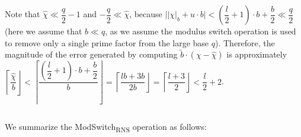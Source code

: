 Note that $\hat\chi \ll \dfrac{q}{2}-1$ and $-\dfrac{q}{2} \ll \hat\chi$, because $\Big||\chi|_b + u\cdot b\Big| < \left(\dfrac{l}{2} + 1\right)\cdot b + \dfrac{b}{2} \ll \dfrac{q}{2}$ (here we assume that $b \ll q$, as we assume the modulus switch operation is used to remove only a single prime factor from the large base $q$). Therefore, the magnitude of the error generated by computing $\tilde b \cdot (\chi - \hat\chi)$ is approximately $\left\lceil\dfrac{\hat\chi}{b}\right\rfloor <  \left\lceil\dfrac{\left(\dfrac{l}{2} + 1\right)\cdot b + \dfrac{b}{2}}{b}\right\rfloor = \left\lceil\dfrac{lb + 3b}{2b}\right\rfloor = \left\lceil\dfrac{l + 3}{2}\right\rfloor < \dfrac{l}{2} + 2$. 


$ $

We summarize the \textsf{ModSwitch\textsubscript{RNS}} operation as follows:


